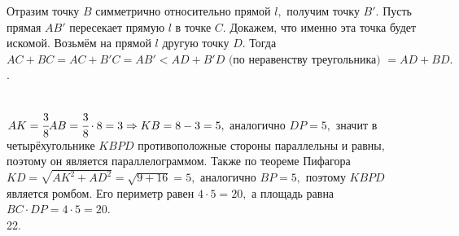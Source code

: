 \documentclass[12pt]{article}
\begin{document}
Отразим точку $B$ симметрично относительно прямой $l,$ получим точку $B'.$ Пусть прямая $AB'$ пересекает прямую $l$ в точке $C.$ Докажем, что именно эта точка будет искомой. Возьмём на прямой $l$ другую точку $D.$ Тогда $AC+BC=AC+B'C=AB'<AD+B'D\text{ (по неравенству треугольника) }=AD+BD.$\newpage{}. \begin{figure}[ht!]
\end{figure}\\
$AK=\cfrac{3}{8}AB=\cfrac{3}{8}\cdot8=3\Rightarrow KB=8-3=5,$ аналогично $DP=5,$ значит в четырёхугольнике $KBPD$ противоположные стороны параллельны и равны, поэтому он является параллелограммом. Также по теореме Пифагора $KD=\sqrt{AK^2+AD^2}=\sqrt{9+16}=5,$ аналогично $BP=5,$ поэтому $KBPD$ является ромбом. Его периметр равен $4\cdot5=20,$ а площадь равна $BC\cdot DP=4\cdot5=20.$\\
22. \begin{figure}[ht!]
\end{figure}\\
\end{document}
